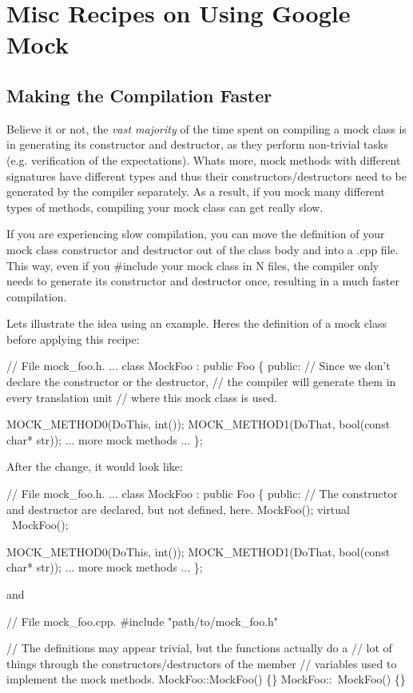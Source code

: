 \section*{Misc Recipes on Using Google Mock}

\subsection*{Making the Compilation Faster}

Believe it or not, the {\itshape vast majority} of the time spent on compiling a mock class is in generating its constructor and destructor, as they perform non-\/trivial tasks (e.\+g. verification of the expectations). What\textquotesingle{}s more, mock methods with different signatures have different types and thus their constructors/destructors need to be generated by the compiler separately. As a result, if you mock many different types of methods, compiling your mock class can get really slow.

If you are experiencing slow compilation, you can move the definition of your mock class\textquotesingle{} constructor and destructor out of the class body and into a {\ttfamily .cpp} file. This way, even if you {\ttfamily \#include} your mock class in N files, the compiler only needs to generate its constructor and destructor once, resulting in a much faster compilation.

Let\textquotesingle{}s illustrate the idea using an example. Here\textquotesingle{}s the definition of a mock class before applying this recipe\+:


\begin{DoxyCode}
// File mock\_foo.h.
...
class MockFoo : public Foo \{
 public:
  // Since we don't declare the constructor or the destructor,
  // the compiler will generate them in every translation unit
  // where this mock class is used.

  MOCK\_METHOD0(DoThis, int());
  MOCK\_METHOD1(DoThat, bool(const char* str));
  ... more mock methods ...
\};
\end{DoxyCode}


After the change, it would look like\+:


\begin{DoxyCode}
// File mock\_foo.h.
...
class MockFoo : public Foo \{
 public:
  // The constructor and destructor are declared, but not defined, here.
  MockFoo();
  virtual ~MockFoo();

  MOCK\_METHOD0(DoThis, int());
  MOCK\_METHOD1(DoThat, bool(const char* str));
  ... more mock methods ...
\};
\end{DoxyCode}
 and 
\begin{DoxyCode}
// File mock\_foo.cpp.
#include "path/to/mock\_foo.h"

// The definitions may appear trivial, but the functions actually do a
// lot of things through the constructors/destructors of the member
// variables used to implement the mock methods.
MockFoo::MockFoo() \{\}
MockFoo::~MockFoo() \{\}
\end{DoxyCode}



